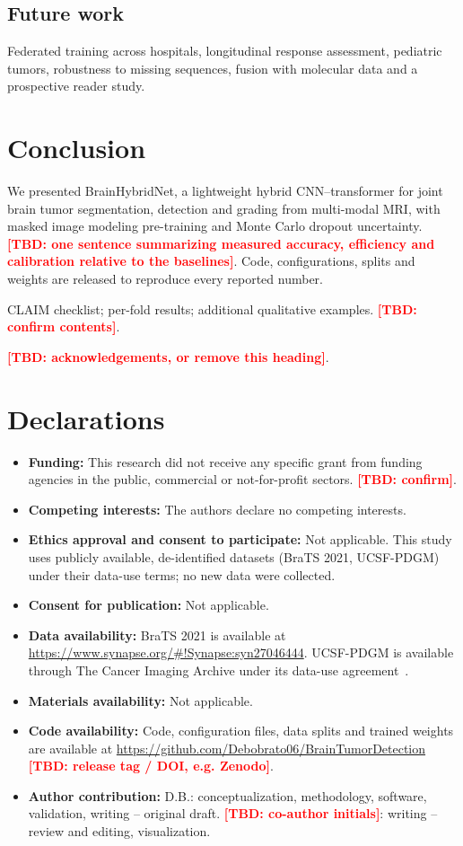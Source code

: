 \documentclass[pdflatex,sn-mathphys-num]{sn-jnl}
\newcommand{\tbd}[1][]{\textcolor{red}{\textbf{[TBD#1]}}}
\begin{document}
\subsection{Future work}
Federated training across hospitals, longitudinal response assessment, pediatric tumors, robustness to missing sequences, fusion with molecular data and a prospective reader study.

\section{Conclusion}\label{sec:conclusion}
We presented BrainHybridNet, a lightweight hybrid CNN--transformer for joint brain tumor segmentation, detection and grading from multi-modal MRI, with masked image modeling pre-training and Monte Carlo dropout uncertainty. \tbd[: one sentence summarizing measured accuracy, efficiency and calibration relative to the baselines]. Code, configurations, splits and weights are released to reproduce every reported number.

\backmatter

CLAIM checklist; per-fold results; additional qualitative examples. \tbd[: confirm contents].

\tbd[: acknowledgements, or remove this heading].

\section*{Declarations}

\begin{itemize}
\item \textbf{Funding:} This research did not receive any specific grant from funding agencies in the public, commercial or not-for-profit sectors. \tbd[: confirm].
\item \textbf{Competing interests:} The authors declare no competing interests.
\item \textbf{Ethics approval and consent to participate:} Not applicable. This study uses publicly available, de-identified datasets (BraTS 2021, UCSF-PDGM) under their data-use terms; no new data were collected.
\item \textbf{Consent for publication:} Not applicable.
\item \textbf{Data availability:} BraTS 2021 is available at \url{https://www.synapse.org/#!Synapse:syn27046444}. UCSF-PDGM is available through The Cancer Imaging Archive under its data-use agreement~\cite{calabrese2022ucsfpdgm}.
\item \textbf{Materials availability:} Not applicable.
\item \textbf{Code availability:} Code, configuration files, data splits and trained weights are available at \url{https://github.com/Debobrato06/BrainTumorDetection} \tbd[: release tag / DOI, e.g. Zenodo].
\item \textbf{Author contribution:} D.B.: conceptualization, methodology, software, validation, writing -- original draft. \tbd[: co-author initials]: writing -- review and editing, visualization.
\end{itemize}


\end{document}
